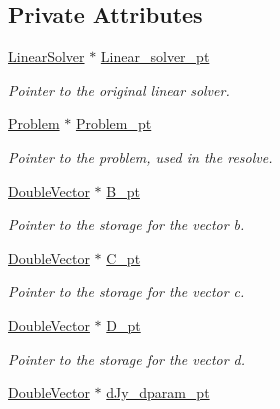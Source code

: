 \subsection*{Private Attributes}
\begin{DoxyCompactItemize}
\item 
\hyperlink{classoomph_1_1LinearSolver}{Linear\+Solver} $\ast$ \hyperlink{classoomph_1_1BlockPitchForkLinearSolver_afcf84124d724d6bd961870fbcdc7b9e4}{Linear\+\_\+solver\+\_\+pt}
\begin{DoxyCompactList}\small\item\em Pointer to the original linear solver. \end{DoxyCompactList}\item 
\hyperlink{classoomph_1_1Problem}{Problem} $\ast$ \hyperlink{classoomph_1_1BlockPitchForkLinearSolver_a5819a48984aa1a9a68c28e106bc22f90}{Problem\+\_\+pt}
\begin{DoxyCompactList}\small\item\em Pointer to the problem, used in the resolve. \end{DoxyCompactList}\item 
\hyperlink{classoomph_1_1DoubleVector}{Double\+Vector} $\ast$ \hyperlink{classoomph_1_1BlockPitchForkLinearSolver_a4e88432fbf8e7cdefbfbd2c67860505e}{B\+\_\+pt}
\begin{DoxyCompactList}\small\item\em Pointer to the storage for the vector b. \end{DoxyCompactList}\item 
\hyperlink{classoomph_1_1DoubleVector}{Double\+Vector} $\ast$ \hyperlink{classoomph_1_1BlockPitchForkLinearSolver_ac9f8e9f84f79437b43e35ae2850ec335}{C\+\_\+pt}
\begin{DoxyCompactList}\small\item\em Pointer to the storage for the vector c. \end{DoxyCompactList}\item 
\hyperlink{classoomph_1_1DoubleVector}{Double\+Vector} $\ast$ \hyperlink{classoomph_1_1BlockPitchForkLinearSolver_a3178ff5ce055b76423b30357022f9e58}{D\+\_\+pt}
\begin{DoxyCompactList}\small\item\em Pointer to the storage for the vector d. \end{DoxyCompactList}\item 
\hyperlink{classoomph_1_1DoubleVector}{Double\+Vector} $\ast$ \hyperlink{classoomph_1_1BlockPitchForkLinearSolver_a3ceff96adc374fb588f106cc3cc9b435}{d\+Jy\+\_\+dparam\+\_\+pt}
\end{DoxyCompactItemize}

